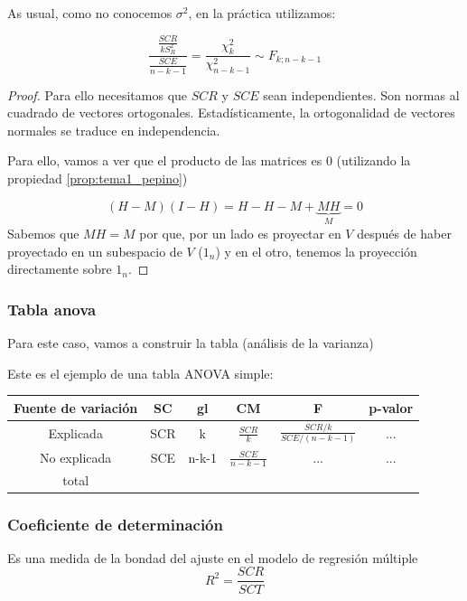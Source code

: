 As usual, como no conocemos $σ^2$, en la práctica utilizamos:
\begin{prop}
\[
\frac{\displaystyle\frac{SCR}{kS_R^2}}{\displaystyle\frac{SCE}{n-k-1}} = \frac{\chi^2_k}{\chi^2_{n-k-1}}\sim F_{k;n-k-1}
\]
\end{prop}
\begin{proof}
Para ello necesitamos que $SCR$ y $SCE$ sean independientes. Son normas al cuadrado de vectores ortogonales. Estadísticamente, la ortogonalidad de vectores normales se traduce en independencia. 

Para ello, vamos a ver que el producto de las matrices es 0 (utilizando la propiedad \ref{prop:tema1_pepino})

\[
(H-M)(I-H) = H-H-M+\underbrace{MH}_{M} = 0
\]
Sabemos que $MH=M$ por que, por un lado es proyectar en $V$ después de haber proyectado en un subespacio de $V$ ($1_n$) y en el otro, tenemos la proyección directamente sobre $1_n$.

\end{proof}

\subsubsection{Tabla anova}
Para este caso, vamos a construir la tabla  (análisis de la varianza)

Este es el ejemplo de una tabla ANOVA simple:
\begin{center}
\begin{tabular}{c|ccccc}
Fuente de variación & SC & gl & CM & F & p-valor\\\hline 
Explicada & SCR & k & $\frac{SCR}{k}$ & $\displaystyle\frac{SCR/k}{SCE/(n-k-1)}$ & ...\\
No explicada & SCE & n-k-1 & $\frac{SCE}{n-k-1}$ & ... & ...\\\hline
total & & & & 
\end{tabular}
\end{center}

\subsubsection{Coeficiente de determinación}
\begin{defn}
Es una medida de la bondad del ajuste en el modelo de regresión múltiple \[R^2 = \frac{SCR}{SCT}\]
\end{defn}

